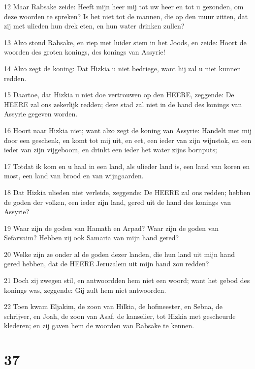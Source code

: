 \par 12 Maar Rabsake zeide: Heeft mijn heer mij tot uw heer en tot u gezonden, om deze woorden te spreken? Is het niet tot de mannen, die op den muur zitten, dat zij met ulieden hun drek eten, en hun water drinken zullen?
\par 13 Alzo stond Rabsake, en riep met luider stem in het Joods, en zeide: Hoort de woorden des groten konings, des konings van Assyrie!
\par 14 Alzo zegt de koning: Dat Hizkia u niet bedriege, want hij zal u niet kunnen redden.
\par 15 Daartoe, dat Hizkia u niet doe vertrouwen op den HEERE, zeggende: De HEERE zal ons zekerlijk redden; deze stad zal niet in de hand des konings van Assyrie gegeven worden.
\par 16 Hoort naar Hizkia niet; want alzo zegt de koning van Assyrie: Handelt met mij door een geschenk, en komt tot mij uit, en eet, een ieder van zijn wijnstok, en een ieder van zijn vijgeboom, en drinkt een ieder het water zijns bornputs;
\par 17 Totdat ik kom en u haal in een land, als ulieder land is, een land van koren en most, een land van brood en van wijngaarden.
\par 18 Dat Hizkia ulieden niet verleide, zeggende: De HEERE zal ons redden; hebben de goden der volken, een ieder zijn land, gered uit de hand des konings van Assyrie?
\par 19 Waar zijn de goden van Hamath en Arpad? Waar zijn de goden van Sefarvaim? Hebben zij ook Samaria van mijn hand gered?
\par 20 Welke zijn ze onder al de goden dezer landen, die hun land uit mijn hand gered hebben, dat de HEERE Jeruzalem uit mijn hand zou redden?
\par 21 Doch zij zwegen stil, en antwoordden hem niet een woord; want het gebod des konings was, zeggende: Gij zult hem niet antwoorden.
\par 22 Toen kwam Eljakim, de zoon van Hilkia, de hofmeester, en Sebna, de schrijver, en Joah, de zoon van Asaf, de kanselier, tot Hizkia met gescheurde klederen; en zij gaven hem de woorden van Rabsake te kennen.

\chapter{37}

